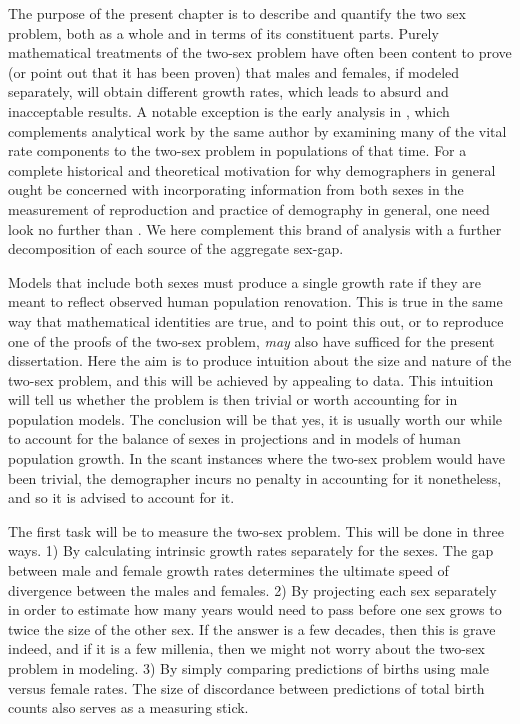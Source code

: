 \label{ch:Measuring}
The purpose of the present chapter is to describe and quantify the two sex
problem, both as a whole and in terms of its constituent parts. Purely
mathematical treatments of the two-sex problem have often been content to 
prove (or point out that it has been proven) that males and females,
if modeled separately, will obtain different growth rates, which leads to
absurd and inacceptable results. A notable exception is the early analysis in
\citet{karmel1948analysis}, which complements analytical work by the same author
\citep{karmel1947relations,karmel1948relations} by examining many of the vital
rate components to the two-sex problem in populations of that time. For a
complete historical and theoretical motivation for why demographers in general
ought be concerned with incorporating information from both sexes in the measurement of reproduction
and practice of demography in general, one need look no further than
\citet{francisco1996dissertation}. We here complement this brand of analysis
with a further decomposition of each source of the aggregate sex-gap.

Models that include both sexes must produce a single growth 
rate if they are meant to reflect observed human population renovation. 
This is true in the same way that mathematical identities are true, and to 
point this out, or to reproduce one of the proofs of the two-sex problem,
\textit{may} also have sufficed for the present dissertation. Here the aim is to produce intuition 
about the size and nature of the two-sex problem, and this will be
achieved by appealing to data. This intuition will tell us whether the 
problem is then trivial or worth accounting for in
population models. The conclusion will be that yes, it is usually worth our
while to account for the balance of sexes in projections and in models of human
population growth. In the scant instances where the two-sex problem would have
been trivial, the demographer incurs no penalty in accounting for it
nonetheless, and so it is advised to account for it.

The first task will be to measure the two-sex problem. This will be done in
three ways. 1) By calculating intrinsic growth rates separately for the sexes.
The gap between male and female growth rates determines the ultimate speed of
divergence between the males and females. 2) By projecting each sex separately
in order to estimate how many years would need to pass before one sex grows to
twice the size of the other sex. If the answer is a few decades, then this is
grave indeed, and if it is a few millenia, then we might not worry about the
two-sex problem in modeling. 3) By simply comparing predictions of births using
male versus female rates. The size of discordance between predictions of total
birth counts also serves as a measuring stick.

